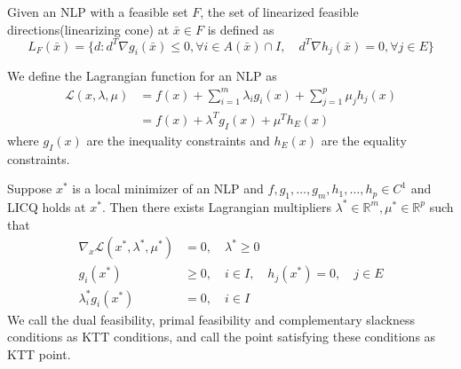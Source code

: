\begin{definition}
    Given an NLP with a feasible set $F$, the set of linearized feasible directions(linearizing cone) at $\bar x \in F$ is defined as 
    $$L_F(\bar x) = \{d: d^T \nabla g_i(\bar x) \leq 0, \forall i \in A(\bar x) \cap I, \quad d^T \nabla h_j(\bar x) = 0, \forall j \in E\}$$
\end{definition}
\begin{definition}
    We define the Lagrangian function for an NLP as 
    \begin{align*}
        \mathcal L(x, \lambda, \mu) &= f(x) + \sum_{i=1}^m \lambda_i g_i(x) + \sum_{j=1}^p \mu_j h_j(x) \\
        &= f(x) + \lambda^T g_I(x) + \mu^T h_E(x)
    \end{align*}
    where $g_I(x)$ are the inequality constraints and $h_E(x)$ are the equality constraints.
\end{definition}
\begin{theorem}
    Suppose $x^*$ is a local minimizer of an NLP and $f,g_1,\ldots,g_m,h_1,\ldots,h_p \in C^1$ and LICQ holds at $x^*$. Then there exists Lagrangian multipliers $\lambda^* \in \mathbb R^m, \mu^* \in \mathbb R^p$ such that
    \begin{align*}
        \nabla_x \mathcal L(x^*, \lambda^*, \mu^*) &= 0, \quad \lambda^* \geq 0 \tag*{Dual feasibility} \\
        g_i(x^*) &\geq 0, \quad i \in I, \quad h_j(x^*) = 0, \quad j \in E \tag*{Primal feasibility} \\
        \lambda^*_i g_i(x^*) &= 0, \quad i \in I \tag*{Complementary slackness}
    \end{align*}
    We call the dual feasibility, primal feasibility and complementary slackness conditions as KTT conditions, and call the point satisfying these conditions as KTT point.
\end{theorem}
